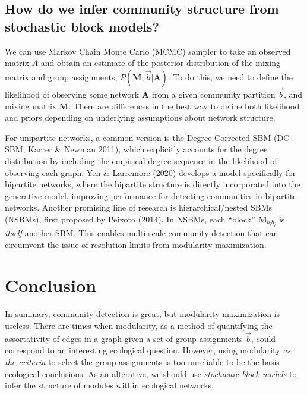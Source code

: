 \documentclass[
]{article}
\begin{document}
\hypertarget{how-do-we-infer-community-structure-from-stochastic-block-models}{%
\subsection{How do we infer community structure from stochastic block
models?}\label{how-do-we-infer-community-structure-from-stochastic-block-models}}

We can use Markov Chain Monte Carlo (MCMC) sampler to take an observed
matrix \(A\) and obtain an estimate of the posterior distribution of the
mixing matrix and group assignments,
\(P(\mathbf{M}, \vec{b} | \mathbf{A})\). To do this, we need to define
the likelihood of observing some network \(\mathbf{A}\) from a given
community partition \(\vec{b}\), and mixing matrix \(\mathbf{M}\). There
are differences in the best way to define both likelihood and priors
depending on underlying assumptions about network structure.

For unipartite networks, a common version is the Degree-Corrected SBM
(DC-SBM, Karrer \& Newman 2011), which explicitly accounts for the
degree distribution by including the empirical degree sequence in the
likelihood of observing each graph. Yen \& Larremore (2020) develops a
model specifically for bipartite networks, where the bipartite structure
is directly incorporated into the generative model, improving
performance for detecting communities in bipartite networks. Another
promising line of research is hierarchical/nested SBMs (NSBMs), first
proposed by Peixoto (2014). In NSBMs, each ``block''
\(\mathbf{M}_{b_i b_j}\) is \emph{itself} another SBM. This enables
multi-scale community detection that can circumvent the issue of
resolution limits from modularity maximization.

\hypertarget{conclusion}{%
\section{Conclusion}\label{conclusion}}

In summary, community detection is great, but modularity maximization is
useless. There are times when modularity, as a method of quantifying the
assortativity of edges in a graph given a set of group assignments
\(\vec{b}\), could correspond to an interesting ecological question.
However, using modularity \emph{as the criteria} to select the group
assignments is too unreliable to be the basis ecological conclusions. As
an alterative, we should use \emph{stochastic block models} to infer the
structure of modules within ecological networks.
\end{document}
